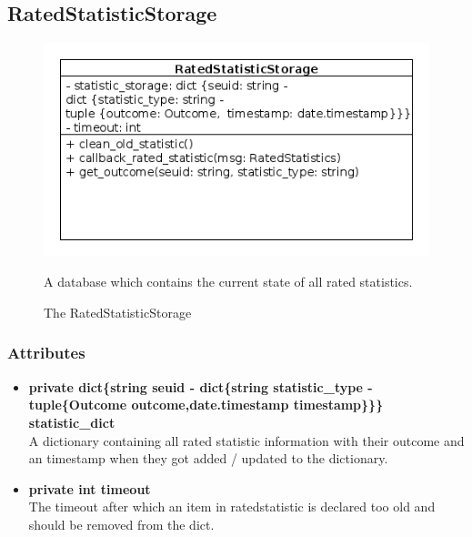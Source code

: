 \newpage
\subsection{RatedStatisticStorage}
\begin{figure}[htbp]
	\begin{minipage}[t]{10cm}
		\vspace{0pt}
		\centering
		\includegraphics[scale=0.6]{./diagram_pictures/reactor/RatedStatisticStorage.png}
		\caption{The RatedStatisticStorage}
	\end{minipage}
	\hfill
	\begin{minipage}[t]{6cm}
		\vspace{10pt}
			A database which contains the current state of all rated statistics.
	\end{minipage}
\end{figure}  

\subsubsection{Attributes}
\begin{itemize}
	\item \textbf{ private dict\{string seuid - dict\{string statistic\_type - tuple\{Outcome outcome,date.timestamp timestamp\}\}\} statistic\_dict }\\
		A dictionary containing all rated statistic information with their outcome and an timestamp when they got added / updated to the dictionary.
	\item \textbf{ private int timeout }\\
		The timeout after which an item in ratedstatistic is declared too old and should be removed from the dict.
\end{itemize}
